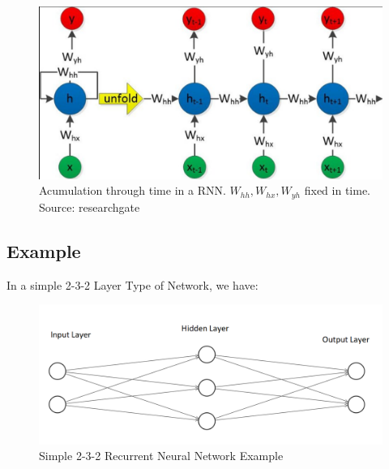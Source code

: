 \documentclass[12pt]{article}
\begin{document}
\begin{figure}[H]
    \centering
    \includegraphics[width=0.7\linewidth]{images/rnn_unfolding.png}
    \caption{Acumulation through time in a RNN. $W_{hh}, W_{hx}, W_{yh}$ fixed in time. Source: researchgate }
    \label{fig2}
\end{figure}   


\subsection{Example}

In a simple 2-3-2 Layer Type of Network, we have:


\begin{figure}[H]
    \centering
    \includegraphics[width=0.7\linewidth]{images/example.png}
    \caption{Simple 2-3-2 Recurrent Neural Network Example}
\end{figure}   
\end{document}
